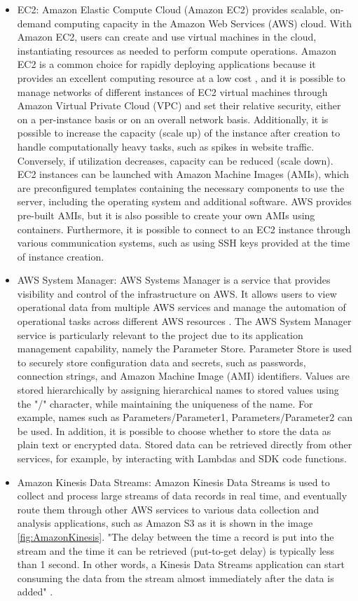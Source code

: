 \begin{itemize}
    \item EC2: Amazon Elastic Compute Cloud (Amazon EC2) provides scalable, on-demand computing capacity in the Amazon Web Services (AWS) cloud. With Amazon EC2, users can create and use virtual machines in the cloud, instantiating resources as needed to perform compute operations. Amazon EC2 is a common choice for rapidly deploying applications because it provides an excellent computing resource at a low cost \cite{AWSEC2}, and it is possible to manage networks of different instances of EC2 virtual machines through Amazon Virtual Private Cloud (VPC) and set their relative security, either on a per-instance basis or on an overall network basis. Additionally, it is possible to increase the capacity (scale up) of the instance after creation to handle computationally heavy tasks, such as spikes in website traffic. Conversely, if utilization decreases, capacity can be reduced (scale down). EC2 instances can be launched with Amazon Machine Images (AMIs), which are preconfigured templates containing the necessary components to use the server, including the operating system and additional software. AWS provides pre-built AMIs, but it is also possible to create your own AMIs using containers. Furthermore, it is possible to connect to an EC2 instance through various communication systems, such as using SSH keys provided at the time of instance creation.
    \item AWS System Manager: AWS Systems Manager is a service that provides visibility and control of the infrastructure on AWS.  It allows users to view operational data from multiple AWS services and manage the automation of operational tasks across different AWS resources \cite{AWSSM}. The AWS System Manager service is particularly relevant to the project due to its application management capability, namely the Parameter Store. Parameter Store is used to securely store configuration data and secrets, such as passwords, connection strings, and Amazon Machine Image (AMI) identifiers. Values are stored hierarchically by assigning hierarchical names to stored values using the "/" character, while maintaining the uniqueness of the name. For example, names such as Parameters/Parameter1, Parameters/Parameter2 can be used. In addition, it is possible to choose whether to store the data as plain text or encrypted data. Stored data can be retrieved directly from other services, for example, by interacting with Lambdas and SDK code functions.
    \item Amazon Kinesis Data Streams: Amazon Kinesis Data Streams is used to collect and process large streams of data records in real time, and eventually route them through other AWS services to various data collection and analysis applications, such as Amazon S3 as it is shown in the image \ref{fig:AmazonKinesis}. "The delay between the time a record is put into the stream and the time it can be retrieved (put-to-get delay) is typically less than 1 second. In other words, a Kinesis Data Streams application can start consuming the data from the stream almost immediately after the data is added" \cite{AWSKinesis}.

\end{itemize}

